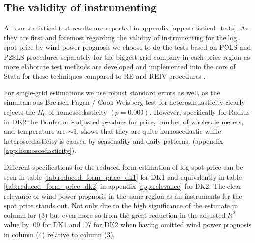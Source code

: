 \subsection{The validity of instrumenting}
\label{subsec:r_validity}
All our statistical test results are reported in appendix \ref{app:statistical_tests}. As they are first and foremost regarding the validity of instrumenting for the log spot price by wind power prognosis we choose to do the tests based on POLS and P2SLS procedures separately for the biggest grid company in each price region as more elaborate test methods are developed and implemented into the core of Stata for these techniques compared to RE and REIV procedures \citep{statacorp2017stata}.
\bigskip\par
For single-grid estimations we use robust standard errors as well, as the simultaneous Breusch-Pagan / Cook-Weisberg test for heteroskedasticity clearly rejects the $H_0$ of homoscedasticity $(p=0.000)$. However, specifically for Radius in DK2 the Bonferroni-adjusted p-values for price, number of wholesale meters, and temperature are $\sim1$, shows that they are quite homoscedastic while heteroscedasticity is caused by seasonality and daily patterns.
 (appendix \ref{app:homoscedasticity}).
\bigskip\par
Different specifications for the reduced form estimation of log spot price can be seen in table \ref{tab:reduced_form_price_dk1} for DK1 and equivalently in table \ref{tab:reduced_form_price_dk2} in appendix \ref{app:relevance} for DK2. The clear relevance of wind power prognosis in the same region as an instruments for the spot price stands out. Not only due to the high significance of the estimate in column for (3) but even more so from the great reduction in the adjusted $R^2$ value by .09 for DK1 and .07 for DK2 when having omitted wind power prognosis in column (4) relative to column (3).

